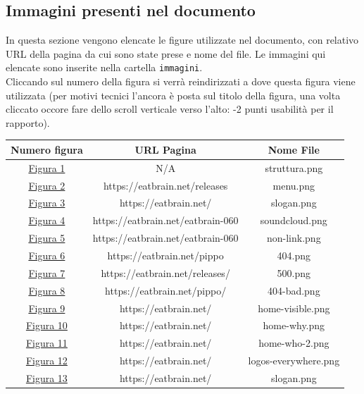 \documentclass[10pt,a4paper]{article}
\begin{document}
\subsection{Immagini presenti nel documento}
In questa sezione vengono elencate le figure utilizzate nel documento, con relativo URL della pagina da cui sono state prese e nome del file. Le immagini qui elencate sono inserite nella cartella \texttt{immagini}. \\
Cliccando sul numero della figura si verrà reindirizzati a dove questa figura viene utilizzata (per motivi tecnici l'ancora è posta sul titolo della figura, una volta cliccato occore fare dello scroll verticale verso l'alto: -2 punti usabilità per il rapporto). \\
\begin{center}
\begin{tabular}{| c | c | c |}
	\hline
	\textbf{Numero figura} & \textbf{URL Pagina} & \textbf{Nome File} \\\hline
	\hyperref[struttura-default]{Figura 1} & N/A & struttura.png \\\hline
	\hyperref[menu]{Figura 2} & https://eatbrain.net/releases & menu.png \\\hline
	\hyperref[slogan-img]{Figura 3} & https://eatbrain.net/ & slogan.png \\\hline
	\hyperref[soundcloud-integration]{Figura 4} & https://eatbrain.net/eatbrain-060 & soundcloud.png \\\hline
	\hyperref[non-link]{Figura 5} & https://eatbrain.net/eatbrain-060 & non-link.png \\\hline
	\hyperref[page-404]{Figura 6} & https://eatbrain.net/pippo & 404.png \\\hline
	\hyperref[page-500]{Figura 7} & https://eatbrain.net/releases/ & 500.png \\\hline
	\hyperref[page-404-bad]{Figura 8} & https://eatbrain.net/pippo/ & 404-bad.png \\\hline
	\hyperref[home-visible]{Figura 9} & https://eatbrain.net/ & home-visible.png \\\hline
	\hyperref[home-where]{Figura 10} & https://eatbrain.net/ & home-why.png \\\hline
	\hyperref[img-home-who]{Figura 11} & https://eatbrain.net/ & home-who-2.png \\\hline
	\hyperref[logos-everywhere]{Figura 12} & https://eatbrain.net/ & logos-everywhere.png \\\hline
	\hyperref[home-why]{Figura 13} & https://eatbrain.net/ & slogan.png \\\hline

\end{tabular}
\end{center}
\end{document}
